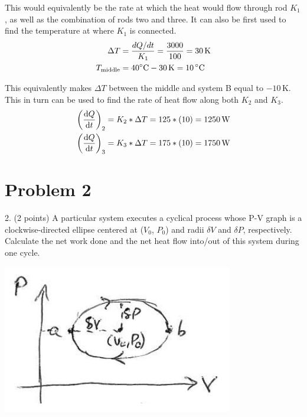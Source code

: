 \documentclass[12pt]{article}
\begin{document}
            This would equivalently be the rate at which the heat would flow through rod $K_1$, as well as the combination of rods two and three.
            It can also be first used to find the temperature at where $K_1$ is connected.
            \begin{align}
                \Delta T    &=  \frac{dQ/dt}{K_1}
                    =   \frac{3000}{100}
                    =   30\,\unit{\kelvin}\\
                T_{\rm middle}  &=  40\unit{\celsius} - 30\,\unit{\kelvin}
                    =   10\,\unit{\celsius}
            \end{align}

            This equivalently makes $\Delta T$ between the middle and system B equal to $-10\,\unit{\kelvin}$. 
            This in turn can be used to find the rate of heat flow along both $K_2$ and $K_3$.
            \begin{align}
                \left( \dv{Q}{t} \right)_2  &=  K_2 * \Delta T
                    =   125 * (10)
                    =   1250\,\unit{\watt}\\
                \left( \dv{Q}{t} \right)_3  &=  K_3 * \Delta T
                    =   175 * (10)
                    =   1750\,\unit{\watt}
            \end{align}

    \pagebreak
    \section{Problem 2}
        2. (2 points) A particular system executes a cyclical process whose P-V graph is a clockwise-directed ellipse centered at ($V_0$, $P_0$) and radii $\delta V$ and $\delta P$, respectively. 
        Calculate the net work done and the net heat ﬂow into/out of this system during one cycle.
        \begin{center}
            \includegraphics{picture_2.png}
        \end{center}
\end{document}
